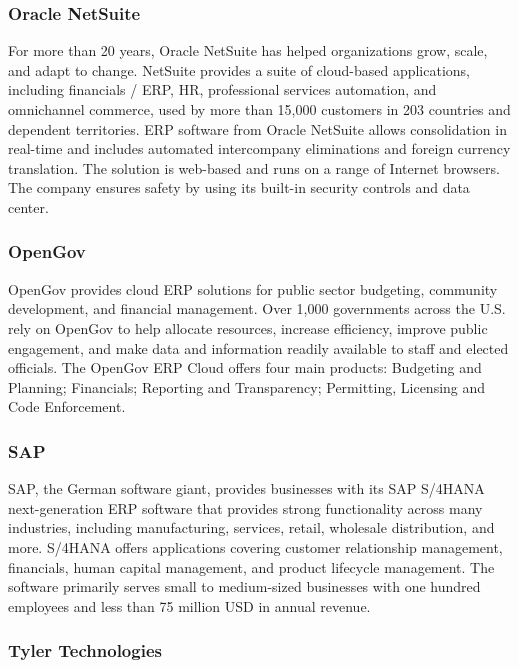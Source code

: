 \subsubsection*{Oracle NetSuite}
For more than 20 years, Oracle NetSuite has helped organizations grow, scale, and adapt to change. NetSuite provides a suite of cloud-based applications, including financials / ERP, HR, professional services automation, and omnichannel commerce, used by more than 15,000 customers in 203 countries and dependent territories. ERP software from Oracle NetSuite allows consolidation in real-time and includes automated intercompany eliminations and foreign currency translation. The solution is web-based and runs on a range of Internet browsers. The company ensures safety by using its built-in security controls and data center.

\cite{Thompson2019}


\subsubsection*{OpenGov}
OpenGov provides cloud ERP solutions for public sector budgeting, community development, and financial management. Over 1,000 governments across the U.S. rely on OpenGov to help allocate resources, increase efficiency, improve public engagement, and make data and information readily available to staff and elected officials. The OpenGov ERP Cloud offers four main products: Budgeting and Planning; Financials; Reporting and Transparency; Permitting, Licensing and Code Enforcement.
\cite{Vasyl2021}

\subsubsection*{SAP}
SAP, the German software giant, provides businesses with its SAP S/4HANA next-generation ERP software that provides strong functionality across many industries, including manufacturing, services, retail, wholesale distribution, and more. S/4HANA offers applications covering customer relationship management, financials, human capital management, and product lifecycle management. The software primarily serves small to medium-sized businesses with one hundred employees and less than 75 million USD in annual revenue.


\subsubsection*{Tyler Technologies}

